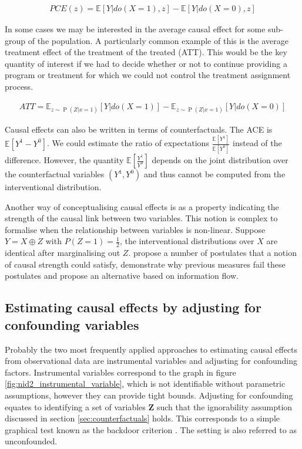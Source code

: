 \documentclass[11pt,a4paper,oneside]{book}
\newcommand{\Esub}[2]{\mathbb E_{#1}\left[{#2}\right]}
\newcommand{\E}[1]{\mathbb E\left[{#1}\right]}
\newcommand{\eqn}[1]{\begin{align}#1\end{align}}
\renewcommand{\P}[1]{\operatorname{P}\left(#1\right)}
\newcommand{\cf}[2]{{#1}^{#2}}
\theoremstyle{plain}
\theoremstyle{definition}
\begin{document}
\eqn{
PCE(z) = \E{Y|do(X=1),z} - \E{Y|do(X=0),z}
}

In some cases we may be interested in the average causal effect for some sub-group of the population. A particularly common example of this is the average treatment effect of the treatment of the treated (ATT). This would be the key quantity of interest if we had to decide whether or not to continue providing a program or treatment for which we could not control the treatment assignment process. 

\eqn{
ATT = \Esub{z\sim \P{Z|x=1}}{Y|do(X = 1)} - \Esub{z\sim \P{Z|x=1}}{Y|do(X=0)}
}

Causal effects can also be written in terms of counterfactuals. The ACE is $\E{\cf{Y}{1} - \cf{Y}{0}}$. We could estimate the ratio of expectations $\frac{\E{\cf{Y}{1}}}{\E{\cf{Y}{0}}}$ instead of the difference. However, the quantity   $\E{\frac{\cf{Y}{1}}{\cf{Y}{0}}}$ depends on the joint distribution over the counterfactual variables $(\cf{Y}{1},\cf{Y}{0})$ and thus cannot be computed from the interventional distribution. 

Another way of conceptualising causal effects is as a property indicating the strength of the causal link between two variables. This notion is complex to formalise when the relationship between variables is non-linear. Suppose $Y = X \oplus Z$ with $P(Z=1)=\frac{1}{2}$, the interventional distributions over $X$ are identical after marginalising out $Z$. \citet{Janzing2013} propose a number of postulates that a notion of causal strength could satisfy, demonstrate why previous measures fail these postulates and propose an alternative based on information flow. 


\subsection{Estimating causal effects by adjusting for confounding variables}
\label{sec:causal_effect_under_ignorability}
Probably the two most frequently applied approaches to estimating causal effects from observational data are instrumental variables and adjusting for confounding factors. Instrumental variables correspond to the graph in figure \ref{fig:nid2_instrumental_variable}, which is not identifiable without parametric assumptions, however they can provide tight bounds. Adjusting for confounding equates to identifying a set of variables $\boldsymbol{Z}$ such that the ignorability assumption discussed in section \ref{sec:counterfactuals} holds. This corresponds to a simple graphical test known as the backdoor criterion \citep{Pearl2000}. The setting is also referred to as unconfounded. 
\end{document}
